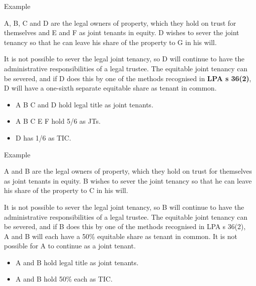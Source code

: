 \documentclass[
]{article}
\providecommand{\tightlist}{%
  \setlength{\itemsep}{0pt}\setlength{\parskip}{0pt}}
\newenvironment{env-de3101d4-f08b-48eb-bc0e-2fa06f3bcf8e}
{
    \savenotes\tcolorbox[blanker,breakable,left=5pt,borderline west={2pt}{-4pt}{purple}]
}
{
    \endtcolorbox\spewnotes
}
\begin{document}
\begin{env-de3101d4-f08b-48eb-bc0e-2fa06f3bcf8e}

Example

A, B, C and D are the legal owners of property, which they hold on trust
for themselves and E and F as joint tenants in equity. D wishes to sever
the joint tenancy so that he can leave his share of the property to G in
his will.

It is not possible to sever the legal joint tenancy, so D will continue
to have the administrative responsibilities of a legal trustee. The
equitable joint tenancy can be severed, and if D does this by one of the
methods recognised in \textbf{LPA s 36(2)}, D will have a one-sixth
separate equitable share as tenant in common.

\begin{itemize}
\tightlist
\item
  A B C and D hold legal title as joint tenants.
\item
  A B C E F hold 5/6 as JTs.
\item
  D has 1/6 as TIC.
\end{itemize}

\end{env-de3101d4-f08b-48eb-bc0e-2fa06f3bcf8e}

\begin{env-de3101d4-f08b-48eb-bc0e-2fa06f3bcf8e}

Example

A and B are the legal owners of property, which they hold on trust for
themselves as joint tenants in equity. B wishes to sever the joint
tenancy so that he can leave his share of the property to C in his will.

It is not possible to sever the legal joint tenancy, so B will continue
to have the administrative responsibilities of a legal trustee. The
equitable joint tenancy can be severed, and if B does this by one of the
methods recognised in LPA s 36(2), A and B will each have a 50\%
equitable share as tenant in common. It is not possible for A to
continue as a joint tenant.

\begin{itemize}
\tightlist
\item
  A and B hold legal title as joint tenants.
\item
  A and B hold 50\% each as TIC.
\end{itemize}

\end{env-de3101d4-f08b-48eb-bc0e-2fa06f3bcf8e}
\end{document}
